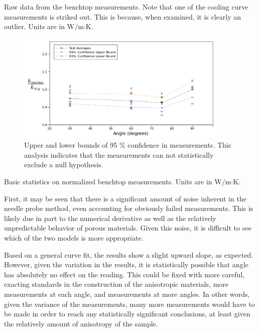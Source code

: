 \begin{table}[h]
\centering

\caption{Raw data from the benchtop measurements. Note that one of the cooling curve measurements is striked out. This is because, when examined, it is clearly an outlier. Units are in W\(/\)m\(\cdot\)K.}
\label{tab:powders}
\end{table}


\begin{figure}[h]
\centering
\includegraphics[width=0.9\textwidth]{fig/test_results_confidence.png}
\caption{Upper and lower bounds of 95 \% confidence in measurements. This analysis 
indicates that the measurements can not statistically exclude a null hypothesis.}
\label{fig:test_confidence}
\end{figure}

\begin{table}[h]
\centering

\caption{Basic statistics on normalized benchtop measurements.  Units are in W\(/\)m\(\cdot\)K.}
\label{tab:pow-stats}
\end{table}


First, it may be seen that there is a significant amount of noise inherent in
the needle probe method, even accounting for obviously failed measurements.
This is likely due in part to the numerical derivative as well as the relatively
unpredictable behavior of porous materials. Given
this noise, it is difficult to see which of the two models is more appropriate.

Based on a general curve fit, the results show a slight upward slope, as
expected. However, given the variation in the results, it is statistically
possible that angle has absolutely no effect on the reading. This could be fixed
with more careful, exacting standards in the construction of the anisotropic
materials, more measurements at each angle, and measurements at more angles.
In other words, given the variance of the measurements, many more measurements
would have to be made in order to reach any statistically significant
conclusions, at least given the relatively amount of anisotropy of the sample.


